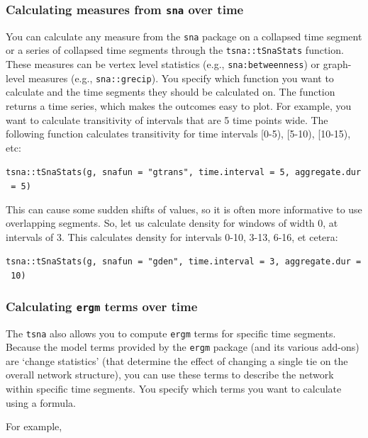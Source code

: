 \documentclass[
]{article}
\begin{document}
\hypertarget{calculating-measures-from-sna-over-time}{%
\subsubsection{\texorpdfstring{Calculating measures from \texttt{sna}
over
time}{Calculating measures from sna over time}}\label{calculating-measures-from-sna-over-time}}

You can calculate any measure from the \texttt{sna} package on a
collapsed time segment or a series of collapsed time segments through
the \texttt{tsna::tSnaStats} function. These measures can be vertex
level statistics (e.g., \texttt{sna:betweenness}) or graph-level
measures (e.g., \texttt{sna::grecip}). You specify which function you
want to calculate and the time segments they should be calculated on.
The function returns a time series, which makes the outcomes easy to
plot. For example, you want to calculate transitivity of intervals that
are 5 time points wide. The following function calculates transitivity
for time intervals {[}0-5), {[}5-10), {[}10-15), etc:

\texttt{tsna::tSnaStats(g,\ snafun\ =\ "gtrans",\ time.interval\ =\ 5,\ aggregate.dur\ =\ 5)}

This can cause some sudden shifts of values, so it is often more
informative to use overlapping segments. So, let us calculate density
for windows of width 0, at intervals of 3. This calculates density for
intervals 0-10, 3-13, 6-16, et cetera:

\texttt{tsna::tSnaStats(g,\ snafun\ =\ "gden",\ time.interval\ =\ 3,\ aggregate.dur\ =\ 10)}

\hypertarget{calculating-ergm-terms-over-time}{%
\subsubsection{\texorpdfstring{Calculating \texttt{ergm} terms over
time}{Calculating ergm terms over time}}\label{calculating-ergm-terms-over-time}}

The \texttt{tsna} also allows you to compute \texttt{ergm} terms for
specific time segments. Because the model terms provided by the
\texttt{ergm} package (and its various add-ons) are `change statistics'
(that determine the effect of changing a single tie on the overall
network structure), you can use these terms to describe the network
within specific time segments. You specify which terms you want to
calculate using a formula.

For example,
\end{document}
